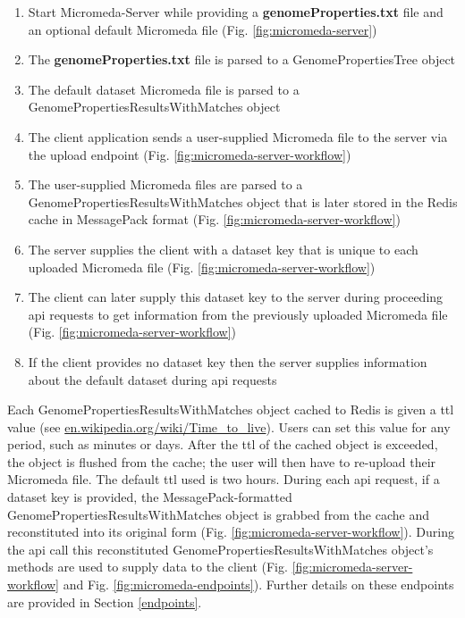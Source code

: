 \begin{enumerate}
  \item Start Micromeda-Server while providing a \textbf{genomeProperties.txt} 
file and an optional default Micromeda file (Fig. \ref{fig:micromeda-server})
  \item The \textbf{genomeProperties.txt} file is parsed to a 
GenomePropertiesTree object
  \item The default dataset Micromeda file is parsed to a 
GenomePropertiesResultsWithMatches object  
  \item The client application sends a user-supplied Micromeda file to the 
server via the upload endpoint (Fig. \ref{fig:micromeda-server-workflow})
  \item The user-supplied Micromeda files are parsed to a 
GenomePropertiesResultsWithMatches object that is later stored in the Redis 
cache in MessagePack format (Fig. \ref{fig:micromeda-server-workflow})
  \item The server supplies the client with a dataset key that is unique to each 
uploaded Micromeda file (Fig. \ref{fig:micromeda-server-workflow})
  \item The client can later supply this dataset key to the server during 
proceeding \gls{api} requests to get information from the previously uploaded 
Micromeda file (Fig. \ref{fig:micromeda-server-workflow})
  \item If the client provides no dataset key then the server supplies 
information about the default dataset during \gls{api} requests
\end{enumerate}

Each GenomePropertiesResultsWithMatches object cached to Redis is given a 
\gls{ttl} value \cite{gwertzman1996world} (see 
\href{http://en.wikipedia.org/wiki/Time_to_live}{en.wikipedia.org/wiki/Time\_to\_live}). 
Users can set this value for any period, such as minutes or days. After the 
\gls{ttl} of the cached object is exceeded, the object is flushed from the cache; the 
user will then have to re-upload their Micromeda file. The default \gls{ttl} 
used is two hours. During each \gls{api} request, if a dataset key is provided, 
the MessagePack-formatted GenomePropertiesResultsWithMatches object is grabbed 
from the cache and reconstituted into its original form (Fig. 
\ref{fig:micromeda-server-workflow}). During the \gls{api} call this 
reconstituted GenomePropertiesResultsWithMatches object's methods are used to 
supply data to the client  (Fig. \ref{fig:micromeda-server-workflow} and Fig. 
\ref{fig:micromeda-endpoints}). Further details on these endpoints are provided 
in Section \ref{endpoints}.


